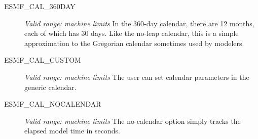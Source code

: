\begin{description}
\item [ESMF\_CAL\_360DAY] 
{\it Valid range: machine limits} 
\newline In the 360-day calendar, there are 12 months, each of which has 30 days.  
Like the no-leap calendar, this is a simple approximation to the Gregorian
calendar sometimes used by modelers.

\item [ESMF\_CAL\_CUSTOM] 
{\it Valid range: machine limits} 
\newline The user can set calendar parameters in the generic calendar.

\item [ESMF\_CAL\_NOCALENDAR] 
{\it Valid range: machine limits}
\newline The no-calendar option simply tracks the elapsed model time in seconds.

\end{description}





